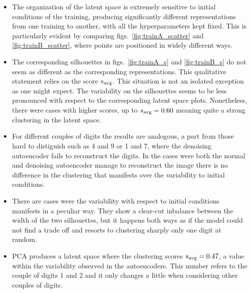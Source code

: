 \documentclass[twocolumn,gsifonts,twoside]{gsipaper}
\begin{document}
\begin{itemize}
\item The organization of the latent space is extremely sensitive to initial conditions of the training, producing significantly different representations from one training to another, with all the hyperparameters kept fixed. This is particularly evident by comparing figs.~\ref{fig:trainA_scatter} and \ref{fig:trainB_scatter}, where points are positioned in widely different ways.

\item The corresponding silhouettes in figs.~\ref{fig:trainA_s} and \ref{fig:trainB_s} do not seem as different as the corresponding representations. This qualitative statement relies on the score $s_\textup{avg}$. This situation is not an isolated exception as one might expect. The variability on the silhouettes seems to be less pronounced with respect to the corresponding latent space plots. Nonetheless, there were cases with higher scores, up to $s_\textup{avg} = 0.60$ meaning quite a strong clustering in the latent space.

\item For different couples of digits the results are analogous, a part from those hard to distiguish such as 4 and 9 or 1 and 7, where the denoising autoencoder fails to reconstruct the digits. In the cases were both the normal and denoising autoencoder manage to reconstruct the image there is no difference in the clustering that manifests over the variability to initial conditions.

\item There are cases were the variability with respect to initial conditions manifests in a peculiar way. They show a clear-cut inbalance between the width of the two silhouettes, but it happens both ways as if the model could not find a trade off and resorts to clustering sharply only one digit at random.

\item PCA produces a latent space where the clustering scores $s_\textup{avg} = 0.47$, a value within the variability observed in the autoencoders. This number refers to the couple of digits 1 and 2 and it only changes a little when considering other couples of digits.
\end{itemize}
\end{document}

